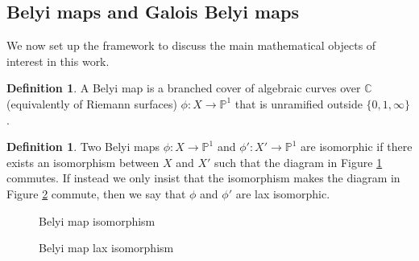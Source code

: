 \documentclass{dcthesis}
\newcommand{\PP}{\mathbb P}
\newcommand{\CC}{\mathbb C}
\newcommand{\defi}[1]{\textsf{#1}}
\theoremstyle{definition}
\newtheorem{definition}[prop]{Definition}
\theoremstyle{remark}
\numberwithin{equation}{section}
\numberwithin{figure}{section}
\begin{document}
{{    \subsection{Belyi maps and Galois Belyi maps}{\label{subsec:belyimaps}
      We now set up the framework to discuss
      the main mathematical objects of interest in this work.
      \begin{definition}\label{def:belyimap}
        A \defi{Belyi map}
        is a branched cover
        of algebraic curves over $\CC$
        (equivalently of Riemann surfaces)
        $\phi\colon X \to \PP^1$
        that is
        unramified outside
        $\{0,1,\infty\}$.
      \end{definition}
      \begin{definition}\label{def:belyiiso}
        Two Belyi maps
        $\phi\colon X\to\PP^1$ and
        $\phi'\colon X'\to\PP^1$
        are \defi{isomorphic}
        if there exists an isomorphism
        between $X$ and $X'$
        such that the diagram in Figure
        \ref{fig:belyiiso}
        commutes.
        If instead we only insist that the isomorphism
        makes the diagram in Figure
        \ref{fig:belyilax} commute,
        then we say that $\phi$ and $\phi'$
        are \defi{lax isomorphic}.
        \begin{figure}[ht]
          \begin{center}
          \end{center}
          \caption{Belyi map isomorphism}
          \label{fig:belyiiso}
        \end{figure}
        \begin{figure}[ht]
          \begin{center}
          \end{center}
          \caption{Belyi map lax isomorphism}
          \label{fig:belyilax}
        \end{figure}
      \end{definition}
}}}
\end{document}
